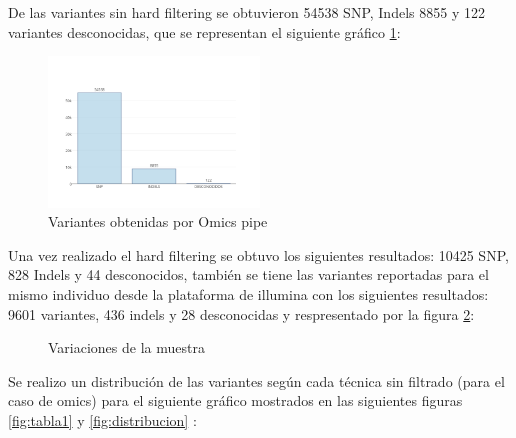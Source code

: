 De las variantes sin hard filtering se obtuvieron 54538 SNP, Indels 8855 y 122 variantes desconocidas, que se representan el siguiente gráfico \ref{fig:omics}: 

\begin{figure}[H]
	\centering
	\includegraphics[width=0.5\textwidth]{Kap2/variantesomics}
	\caption{Variantes obtenidas por Omics pipe} \label{fig:omics}
\end{figure}

Una vez realizado el hard filtering se obtuvo los siguientes resultados: 10425 SNP, 828 Indels y 44 desconocidos, también se tiene las variantes reportadas para el mismo individuo desde la plataforma de illumina con los siguientes resultados: 9601 variantes, 436 indels y 28 desconocidas  y respresentado por la figura \ref{f:histogramas}:

\begin{figure}[H]
	\caption{Variaciones de la muestra}
	\label{f:histogramas}
\end{figure}

Se realizo un distribución de las variantes según cada técnica sin filtrado (para el caso de omics) para el siguiente gráfico mostrados en las siguientes figuras  \ref{fig:tabla1} y \ref{fig:distribucion} :

